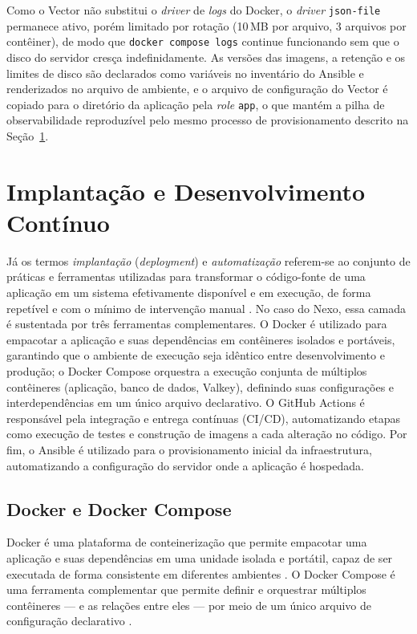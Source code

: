 Como o Vector não substitui o \textit{driver} de \textit{logs} do Docker, o
\textit{driver} \texttt{json-file} permanece ativo, porém limitado por
rotação (10\,MB por arquivo, 3 arquivos por contêiner), de modo que
\texttt{docker compose logs} continue funcionando sem que o disco do servidor
cresça indefinidamente. As versões das imagens, a retenção e os limites de
disco são declarados como variáveis no inventário do Ansible e renderizados
no arquivo de ambiente, e o arquivo de configuração do Vector é copiado para
o diretório da aplicação pela \textit{role} \texttt{app}, o que mantém a
pilha de observabilidade reproduzível pelo mesmo processo de provisionamento
descrito na Seção~\ref{sec:deploy-and-ci}.

\section{Implantação e Desenvolvimento Contínuo} \label{sec:deploy-and-ci}

Já os termos \textit{implantação} (\textit{deployment}) e
\textit{automatização} referem-se ao conjunto de práticas e ferramentas
utilizadas para transformar o código-fonte de uma aplicação em um sistema
efetivamente disponível e em execução, de forma repetível e com o mínimo de
intervenção manual \cite{Humble_Farley_2011}. No caso do Nexo, essa camada é
sustentada por três ferramentas complementares. O Docker é utilizado para
empacotar a aplicação e suas dependências em contêineres isolados e portáveis,
garantindo que o ambiente de execução seja idêntico entre desenvolvimento e
produção; o Docker Compose orquestra a execução conjunta de múltiplos
contêineres (aplicação, banco de dados, Valkey), definindo suas configurações e
interdependências em um único arquivo declarativo. O GitHub Actions é
responsável pela integração e entrega contínuas (CI/CD), automatizando
etapas como execução de testes e construção de imagens a cada alteração no
código. Por fim, o Ansible é utilizado para o provisionamento inicial da
infraestrutura, automatizando a configuração do servidor onde a aplicação é
hospedada.

\subsection{Docker e Docker Compose}

Docker é uma plataforma de conteinerização que permite empacotar uma
aplicação e suas dependências em uma unidade isolada e portátil, capaz de ser
executada de forma consistente em diferentes ambientes \citep{docker:2026}. O
Docker Compose é uma ferramenta complementar que permite definir e orquestrar
múltiplos contêineres --- e as relações entre eles --- por meio de um único
arquivo de configuração declarativo \citep{dockercompose:2026}.

